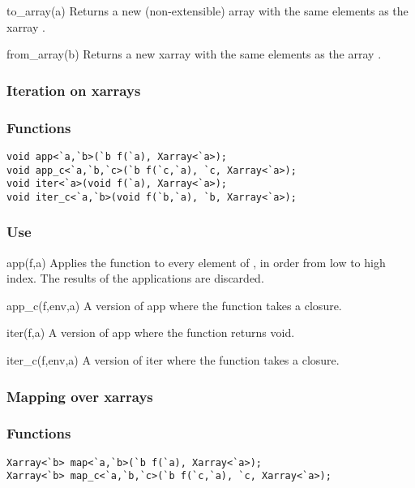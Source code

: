 \begin{defun}{to_array}{(a)}
Returns a new (non-extensible) array with the same elements as the
xarray .
\end{defun}

\begin{defun}{from_array}{(b)}
Returns a new xarray with the same elements as the array .
\end{defun}

\subsubsection*{Iteration on xarrays}
\subsubsection*{Functions}
\begin{verbatim}
void app<`a,`b>(`b f(`a), Xarray<`a>);
void app_c<`a,`b,`c>(`b f(`c,`a), `c, Xarray<`a>);
void iter<`a>(void f(`a), Xarray<`a>);
void iter_c<`a,`b>(void f(`b,`a), `b, Xarray<`a>);
\end{verbatim}

\subsubsection*{Use}

\begin{defun}{app}{(f,a)}
Applies the function  to every element of , in order from
low to high index.  The results of the applications are discarded.
\end{defun}

\begin{defun}{app_c}{(f,env,a)}
A version of app where the function  takes a closure.
\end{defun}

\begin{defun}{iter}{(f,a)}
A version of app where the function  returns void.
\end{defun}

\begin{defun}{iter_c}{(f,env,a)}
A version of iter where the function  takes a closure.
\end{defun}

\subsubsection*{Mapping over xarrays}
\subsubsection*{Functions}
\begin{verbatim}
Xarray<`b> map<`a,`b>(`b f(`a), Xarray<`a>);
Xarray<`b> map_c<`a,`b,`c>(`b f(`c,`a), `c, Xarray<`a>);
\end{verbatim}

